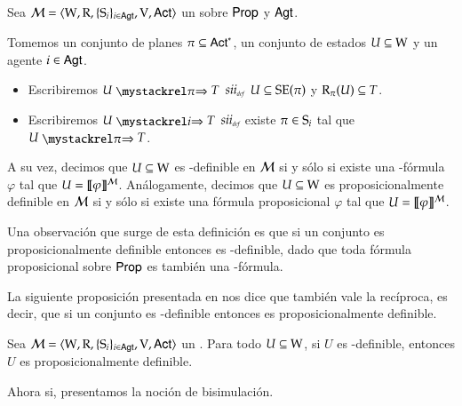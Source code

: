 \begin{definicion}
    Sea $\model=\tup{\W,\R,\cset{\S_i}_{i \in \AGT},\V,\ACT}$ un \ults sobre $\PROP$ y $\AGT$.

    Tomemos un conjunto de planes $\pi \subseteq \ACT^*$, un conjunto de estados $U \subseteq \W$ y un agente $i \in \AGT$.
    \begin{itemize}
        \item Escribiremos $U \ultsExecStrat{\pi} T$ $\iffdef$ $U \subseteq \sexec(\pi)$ y $\R_\pi(U) \subseteq T$.
        \item Escribiremos $U \ultsExecAgi T$ $\iffdef$ existe $\pi \in \S_i$ tal que $U \ultsExecStrat{\pi} T$.
    \end{itemize}
    A su vez, decimos que $U \subseteq \W$ es \KHilogic-definible en $\modults$ si y sólo si existe una \KHilogic-fórmula $\varphi$ tal que
    $U = \truthset{\modults}{\varphi}$. Análogamente, decimos que $U \subseteq \W$ es proposicionalmente definible en $\modults$ 
    si y sólo si existe una fórmula proposicional $\varphi$ tal que $U = \truthset{\modults}{\varphi}$.
\end{definicion}

Una observación que surge de esta definición es que si un conjunto es proposicionalmente definible entonces es \KHilogic-definible, dado que 
toda fórmula proposicional sobre $\PROP$ es también una \KHilogic-fórmula.

La siguiente proposición presentada en \cite{ArecesFSV25,SaraviaPHD} nos dice que también vale la recíproca, 
es decir, que si un conjunto es \KHilogic-definible entonces es proposicionalmente definible.

\begin{proposicion}\label{prop:khi-implies-prop-definable}
    Sea $\model=\tup{\W,\R,\cset{\S_i}_{i \in \AGT},\V,\ACT}$ un \ults. Para todo $U \subseteq \W$, si $U$ es \KHilogic-definible, entonces $U$ es proposicionalmente definible.
\end{proposicion}

Ahora si, presentamos la noción de bisimulación.

